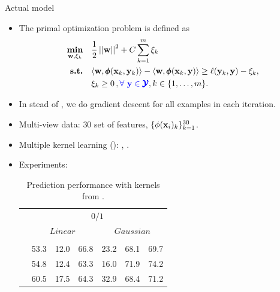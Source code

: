 \documentclass[first=dgreen,second=purple,logo=red]{aaltoslides}
\begin{document}
%
\begin{frame}{Actual model}
	\begin{itemize}
		\item The primal optimization problem is defined as
		\begin{align*}
			\underset{\mathbf {w},\xi_k}{\textbf{min}} & \quad \frac{1}{2}\left|\left| \mathbf {w} \right|\right|^2 + C\sum_{k=1}^{m}\xi_k \\
			\textbf{s.t.} & \quad \langle \mathbf {w}, \pmb \phi(\mathbf {x}_k,\mathbf {y}_k) \rangle - \langle \mathbf {w}, \pmb \phi(\mathbf {x}_k,\mathbf {y}) \rangle  \geq \ell(\mathbf {y}_k,\mathbf {y}) -  \xi_k, \nonumber\\
			& \quad \xi_k\ge0\, , {\color{blue} \forall\ \mathbf {y}\in\pmb {\mathcal{Y}}}, k \in \{ 1,\dots,m \}.\nonumber
		\end{align*}
		\item In stead of \cgd, we do gradient descent for all examples in each iteration.
		\item Multi-view data: $30$ set of features, $\{\phi(\mathbf {x}_i)_k\}_{k=1}^{30}$.
		\item Multiple kernel learning (\mkl): \kalign, \kalignf.
		\item Experiments:
		\begin{table}
		\centering \footnotesize
		\begin{tabular}{|p{1cm}|p{0.3cm}p{0.3cm}p{0.8cm}|p{0.3cm}p{0.3cm}p{0.8cm}|} \hline
			\footnotesize
		    & \multicolumn{6}{c|}{$0/1$} \\ \cline{2-7}
		    & \multicolumn{3}{c|}{$Linear$} & \multicolumn{3}{c|}{$Gaussian$} \\ \cline{2-7}
		    & \svm & \mmr & \mmcrf & \svm & \mmr & \mmcrf \\ \hline
		\unif    & 53.3 &  12.0  & 66.8  & 23.2  & 68.1  & 69.7                \\ 
		\kalign  & 54.8 &  12.4  & 63.3  & 16.0  & 71.9  & 74.2              \\
		\kalignf & 60.5 &  17.5  & 64.3  & 32.9  & 68.4  & 71.2              \\ \hline
		\end{tabular}
		\vspace{-3mm}
		\caption{\footnotesize Prediction performance with kernels from \mkl.}
		\end{table}
	\end{itemize}
\end{frame}
\end{document}
